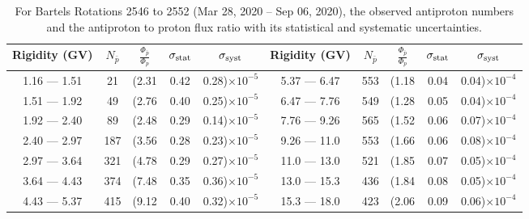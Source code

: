 \begin{table}[p] 
\renewcommand\baselinestretch{1.3}\selectfont
\setlength\tabcolsep{3pt}
\centering
\begin{tabular}{ccccc | ccccc}
\hline
\textbf{Rigidity}  (GV)  & $N_{\bar{p}}$ & $\frac{\Phi_{\bar{p}}}{\Phi_{p}}$ & $\sigma_{\rm{stat}}$ & $\sigma_{\rm{syst}}$ \hspace{1cm}   & \textbf{Rigidity}  (GV)  & $N_{\bar{p}}$ & $\frac{\Phi_{\bar{p}}}{\Phi_{p}}$ & $\sigma_{\rm{stat}}$ & $\sigma_{\rm{syst}}$ \hspace{1cm} \\ 
\hline
1.16 — 1.51   &  21                  &(2.31                          &  0.42              &      0.28)$\times 10^{-5}$  & 5.37 — 6.47                &  553                    &(1.18                                &  0.04                   &      0.04)$\times 10^{-4}$\\
1.51 — 1.92   &  49                  &(2.76                          &  0.40              &      0.25)$\times 10^{-5}$  & 6.47 — 7.76                &  549                    &(1.28                                &  0.05                   &      0.04)$\times 10^{-4}$\\
1.92 — 2.40   &  89                  &(2.48                          &  0.29              &      0.14)$\times 10^{-5}$  & 7.76 — 9.26                &  565                    &(1.52                                &  0.06                   &      0.07)$\times 10^{-4}$\\    
2.40 — 2.97   &  187                &(3.56                          &  0.28              &      0.23)$\times 10^{-5}$  & 9.26 — 11.0                &  553                    &(1.66                                &  0.06                   &      0.08)$\times 10^{-4}$\\    
2.97 — 3.64   &  321                &(4.78                          &  0.29              &      0.27)$\times 10^{-5}$  & 11.0 — 13.0                 &  521                   &(1.85                                &  0.07                   &      0.05)$\times 10^{-4}$\\
3.64 — 4.43   &  374                &(7.48                          &  0.35              &      0.36)$\times 10^{-5}$  & 13.0 — 15.3               &  436                    &(1.84                                &  0.08                   &      0.05)$\times 10^{-4}$\\
4.43 — 5.37   &  415                &(9.12                          &  0.40              &      0.32)$\times 10^{-5}$  & 15.3 — 18.0               &  423                    &(2.06                                &  0.09                   &      0.06)$\times 10^{-4}$\\
\hline
\end{tabular}
\caption[Antiproton to proton flux ratio for Bartels Rotations 2546 to 2552]{For Bartels Rotations 2546 to 2552 (Mar 28, 2020 – Sep 06, 2020), the observed antiproton numbers and the antiproton to proton flux ratio with its statistical and systematic uncertainties.}
\label{TableOfDependent21}
\end{table}

